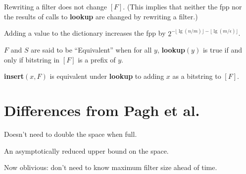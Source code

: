 \documentclass[11pt,letterpaper]{article}
\begin{document}
Rewriting a filter does not change $[F]$. (This implies that neither the fpp nor the results of calls to {\bf lookup} are changed by rewriting a filter.)

Adding a value to the dictionary increases the fpp by $2^{-\lfloor \lg (n/m) \rfloor - \lfloor \lg (m/\epsilon) \rfloor}$.

$F$ and $S$ are said to be ``Equivalent'' when for all $y$, {\bf lookup$(y)$} is true if and only if bitstring in $[F]$ is a prefix of $y$.

{\bf insert$(x, F)$} is equivalent under {\bf lookup} to adding $x$ as a bitstring to $[F]$.

\section{Differences from Pagh et al.}

Doesn't need to double the space when full.

An asymptotically reduced upper bound on the space.

Now oblivious: don't need to know maximum filter size ahead of time.

{}

\end{document}
